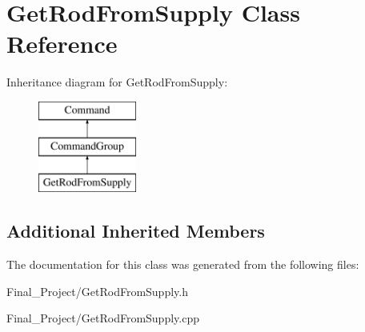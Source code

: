 \hypertarget{classGetRodFromSupply}{\section{Get\-Rod\-From\-Supply Class Reference}
\label{classGetRodFromSupply}
}
Inheritance diagram for Get\-Rod\-From\-Supply\-:\begin{figure}[H]
\begin{center}
\leavevmode
\includegraphics[height=3.000000cm]{classGetRodFromSupply}
\end{center}
\end{figure}
\subsection*{Additional Inherited Members}


The documentation for this class was generated from the following files\-:\begin{DoxyCompactItemize}
\item 
Final\-\_\-\-Project/Get\-Rod\-From\-Supply.\-h\item 
Final\-\_\-\-Project/Get\-Rod\-From\-Supply.\-cpp\end{DoxyCompactItemize}
